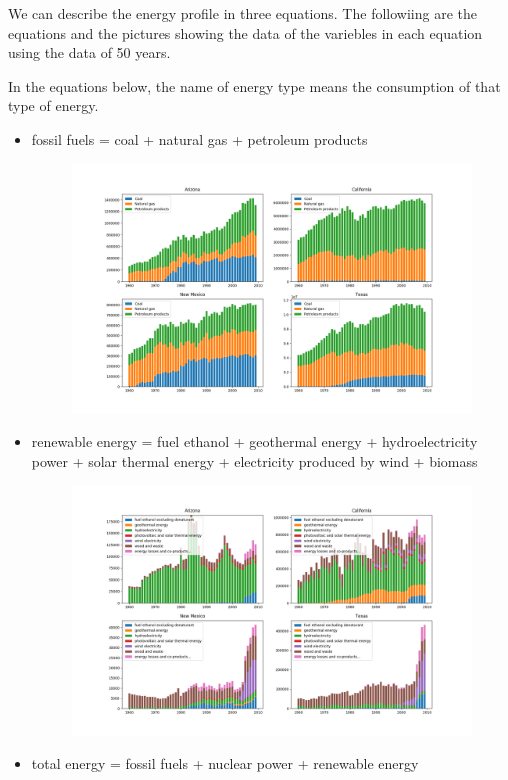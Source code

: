 \documentclass{mcmthesis}
\begin{document}
We can describe the energy profile in three equations. The followiing are the equations and the pictures showing the data of the variebles in each equation using the data of 50 years.

In the equations below, the name of energy type means the consumption of that type of energy.

\begin{itemize}
\newpage
\item 
fossil fuels = coal + natural gas + petroleum products 
\begin{figure}[!h]
    \centering
    \includegraphics[width=\textwidth]{figures//figure2.jpg}
  \end{figure}
 
\item renewable energy = fuel ethanol + geothermal energy + hydroelectricity power + solar thermal energy + electricity produced by wind + biomass
\begin{figure}[!h]
    \centering
    \includegraphics[width=\textwidth]{figures//figure4.jpg}
  \end{figure}
\item total energy = fossil fuels + nuclear power + renewable energy
 

\end{itemize}
\end{document}
